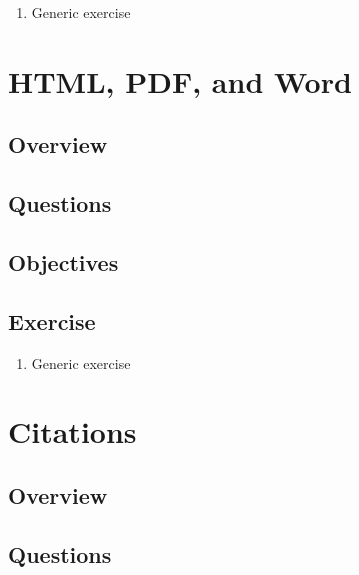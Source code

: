 \documentclass[]{article}
\providecommand{\tightlist}{%
  \setlength{\itemsep}{0pt}\setlength{\parskip}{0pt}}
\begin{document}
\begin{enumerate}
\def\labelenumi{\arabic{enumi}.}
\tightlist
\item
  Generic exercise
\end{enumerate}

\hypertarget{html-pdf-and-word}{%
\section{HTML, PDF, and Word}\label{html-pdf-and-word}}

\hypertarget{overview-4}{%
\subsection{Overview}\label{overview-4}}

\hypertarget{questions-4}{%
\subsection{Questions}\label{questions-4}}

\hypertarget{objectives-3}{%
\subsection{Objectives}\label{objectives-3}}

\hypertarget{exercise-2}{%
\subsection{Exercise}\label{exercise-2}}

\begin{enumerate}
\def\labelenumi{\arabic{enumi}.}
\tightlist
\item
  Generic exercise
\end{enumerate}

\hypertarget{citations}{%
\section{Citations}\label{citations}}

\hypertarget{overview-5}{%
\subsection{Overview}\label{overview-5}}

\hypertarget{questions-5}{%
\subsection{Questions}\label{questions-5}}
\end{document}
